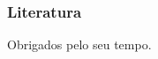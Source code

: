 \documentclass{beamer}
\begin{document}
\begin{frame}[allowframebreaks]
	\frametitle{Literatura}
	 
	
  \nocite{*}
\end{frame}



\begin{frame}
  \begin{center}
    \Huge {\color{red} Obrigados pelo seu tempo.} 
  \end{center}
\end{frame}
\end{document}
